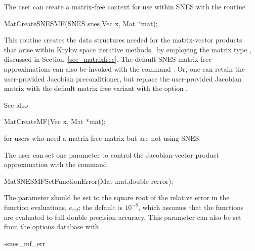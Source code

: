 The user can create a matrix-free context for use within SNES with 
the routine
\begin{tabbing}
  MatCreateSNESMF(SNES snes,Vec x, Mat *mat);
\end{tabbing}
This routine creates the data structures needed for the matrix-vector 
products that arise within Krylov space iterative methods~\cite{brownsaad:90}
by employing the matrix type , 
discussed in Section~\ref{sec_matrixfree}.  The default SNES matrix-free
approximations can also be invoked with the command . 
Or, one can retain the user-provided Jacobian preconditioner, but replace the 
user-provided Jacobian matrix with the default matrix free variant with the
option . 

See also
\begin{tabbing}
  MatCreateMF(Vec x, Mat *mat);
\end{tabbing}
for users who need a matrix-free matrix but are not using SNES.

The user can set one parameter to control the Jacobian-vector
product approximation with the command
\begin{tabbing}
  MatSNESMFSetFunctionError(Mat mat,double rerror);
\end{tabbing}
The parameter  should be set to the square root of the 
relative error in the function evaluations, $e_{rel}$; the default is $ 10^{-8} $, 
which assumes that the functions are evaluated to full double precision accuracy. 
This parameter can also be set from the options database with 
\begin{tabbing}
   -snes\_mf\_err 
\end{tabbing}

